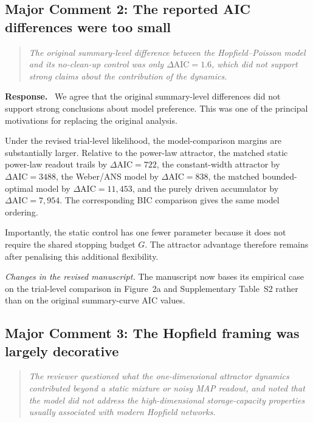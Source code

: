 \documentclass[11pt]{article}
\newenvironment{reviewercomment}{\begin{quote}\color{reviewgray}\itshape}{\end{quote}}
\newenvironment{authorresponse}{\par\noindent\textbf{\color{responseblue}Response.}\ }{\par}
\newcommand{\change}[1]{\par\noindent\textit{Changes in the revised manuscript.} #1\par}
\begin{document}
\subsection*{Major Comment 2: The reported AIC differences were too small}

\begin{reviewercomment}
The original summary-level difference between the Hopfield--Poisson model and its no-clean-up control was only $\Delta\mathrm{AIC}=1.6$, which did not support strong claims about the contribution of the dynamics.
\end{reviewercomment}

\begin{authorresponse}
We agree that the original summary-level differences did not support strong conclusions about model preference. This was one of the principal motivations for replacing the original analysis.

Under the revised trial-level likelihood, the model-comparison margins are substantially larger. Relative to the power-law attractor, the matched static power-law readout trails by $\Delta\mathrm{AIC}=722$, the constant-width attractor by $\Delta\mathrm{AIC}=3488$, the Weber/ANS model by $\Delta\mathrm{AIC}=838$, the matched bounded-optimal model by $\Delta\mathrm{AIC}=11{,}453$, and the purely driven accumulator by $\Delta\mathrm{AIC}=7{,}954$. The corresponding BIC comparison gives the same model ordering.

Importantly, the static control has one fewer parameter because it does not require the shared stopping budget $G$. The attractor advantage therefore remains after penalising this additional flexibility.
\end{authorresponse}

\change{The manuscript now bases its empirical case on the trial-level comparison in Figure~2a and Supplementary Table~S2 rather than on the original summary-curve AIC values.}

\subsection*{Major Comment 3: The Hopfield framing was largely decorative}

\begin{reviewercomment}
The reviewer questioned what the one-dimensional attractor dynamics contributed beyond a static mixture or noisy MAP readout, and noted that the model did not address the high-dimensional storage-capacity properties usually associated with modern Hopfield networks.
\end{reviewercomment}
\end{document}
